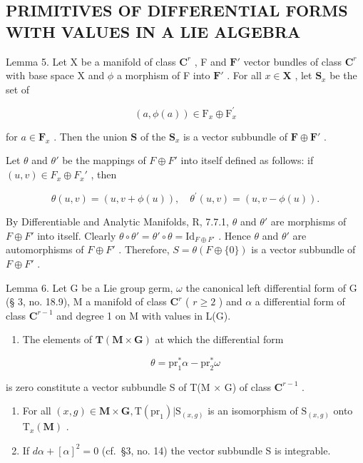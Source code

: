 \subsection{PRIMITIVES OF DIFFERENTIAL FORMS WITH VALUES IN A LIE ALGEBRA}

Lemma 5. Let X be a manifold of class \(\mathbf{C}^r\) , F and \(\mathbf{F}'\) vector bundles of class \(\mathbf{C}^r\) with base space X and \(\phi\) a morphism of F into \(\mathbf{F}'\) . For all \(x \in \mathbf{X}\) , let \(\mathbf{S}_x\) be the set of

\[
(a, \phi (a)) \in \mathrm{F} _ {x} \oplus \mathrm{F} _ {x} ^ {\prime}
\]

for \(a \in \mathbf{F}_x\) . Then the union \(\mathbf{S}\) of the \(\mathbf{S}_x\) is a vector subbundle of \(\mathbf{F} \oplus \mathbf{F}'\) .

Let \(\theta\) and \(\theta'\) be the mappings of \(F \oplus F'\) into itself defined as follows: if \((u, v) \in F_x \oplus F_x'\) , then

\[
\theta (u, v) = (u, v + \phi (u)), \quad \theta^ {\prime} (u, v) = (u, v - \phi (u)).
\]

By Differentiable and Analytic Manifolds, R, 7.7.1, \(\theta\) and \(\theta'\) are morphisms of \(F \oplus F'\) into itself. Clearly \(\theta \circ \theta' = \theta' \circ \theta = \mathrm{Id}_{F\oplus F'}\) . Hence \(\theta\) and \(\theta'\) are automorphisms of \(F \oplus F'\) . Therefore, \(S = \theta(F \oplus \{0\})\) is a vector subbundle of \(F \oplus F'\) .

Lemma 6. Let G be a Lie group germ, \(\omega\) the canonical left differential form of G (§ 3, no. 18.9), M a manifold of class \(\mathbf{C}^r\) ( \(r \geqslant 2\) ) and \(\alpha\) a differential form of class \(\mathbf{C}^{r-1}\) and degree 1 on M with values in L(G).

\begin{enumerate}
\def\labelenumi{(\roman{enumi})}
\tightlist
\item
  The elements of \(\mathbf{T}(\mathbf{M}\times \mathbf{G})\) at which the differential form
\end{enumerate}

\[
\theta = \mathrm{pr} _ {1} ^ {*} \alpha - \mathrm{pr} _ {2} ^ {*} \omega
\]

is zero constitute a vector subbundle S of T(M × G) of class \(\mathbf{C}^{r-1}\) .

\begin{enumerate}
\def\labelenumi{(\roman{enumi})}
\setcounter{enumi}{1}
\item
  For all \((x,g)\in \mathbf{M}\times \mathbf{G},\mathrm{T}(\mathrm{pr}_1)|\mathrm{S}_{(x,g)}\) is an isomorphism of \(\mathrm{S}_{(x,g)}\) onto \(\mathrm{T}_x(\mathbf{M})\) .
\item
  If \(d\alpha + [\alpha]^2 = 0\) (cf.~§3, no. 14) the vector subbundle S is integrable.
\end{enumerate}

